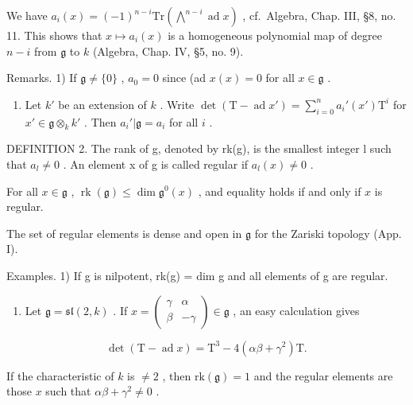 We have \(a_i(x) = (-1)^{n - i}\mathrm{Tr}\left(\bigwedge^{n - i}\operatorname {ad}x\right)\) , cf.~Algebra, Chap. III, §8, no. 11. This shows that \(x\mapsto a_i(x)\) is a homogeneous polynomial map of degree \(n - i\) from \(\mathfrak{g}\) to \(k\) (Algebra, Chap. IV, §5, no. 9).

Remarks. 1) If \(\mathfrak{g} \neq \{0\}\) , \(a_0 = 0\) since (ad \(x(x) = 0\) for all \(x \in \mathfrak{g}\) .

\begin{enumerate}
\def\labelenumi{\arabic{enumi})}
\setcounter{enumi}{1}
\tightlist
\item
  Let \(k'\) be an extension of \(k\) . Write \(\det(\mathrm{T} - \operatorname{ad} x') = \sum_{i=0}^{n} a_i'(x') \mathrm{T}^i\) for \(x' \in \mathfrak{g} \otimes_k k'\) . Then \(a_i'| \mathfrak{g} = a_i\) for all \(i\) .
\end{enumerate}

DEFINITION 2. The rank of g, denoted by rk(g), is the smallest integer l such that \(a_{l} \neq 0\) . An element x of g is called regular if \(a_{l}(x) \neq 0\) .

For all \(x \in \mathfrak{g}\) , \(\operatorname{rk}(\mathfrak{g}) \leq \dim \mathfrak{g}^0(x)\) , and equality holds if and only if \(x\) is regular.

The set of regular elements is dense and open in \(\mathfrak{g}\) for the Zariski topology (App. I).

Examples. 1) If g is nilpotent, rk(g) = dim g and all elements of g are regular.

\begin{enumerate}
\def\labelenumi{\arabic{enumi})}
\setcounter{enumi}{1}
\tightlist
\item
  Let \(\mathfrak{g} = \mathfrak{sl}(2,k)\) . If \(x = \begin{pmatrix} \gamma & \alpha \\ \beta & -\gamma \end{pmatrix} \in \mathfrak{g}\) , an easy calculation gives
\end{enumerate}

\[
\det (\mathrm{T} - \operatorname{ad} x) = \mathrm{T} ^ {3} - 4 (\alpha \beta + \gamma^ {2}) \mathrm{T}.
\]

If the characteristic of \(k\) is \(\neq 2\) , then \(\mathrm{rk}(\mathfrak{g}) = 1\) and the regular elements are those \(x\) such that \(\alpha \beta + \gamma^2 \neq 0\) .

